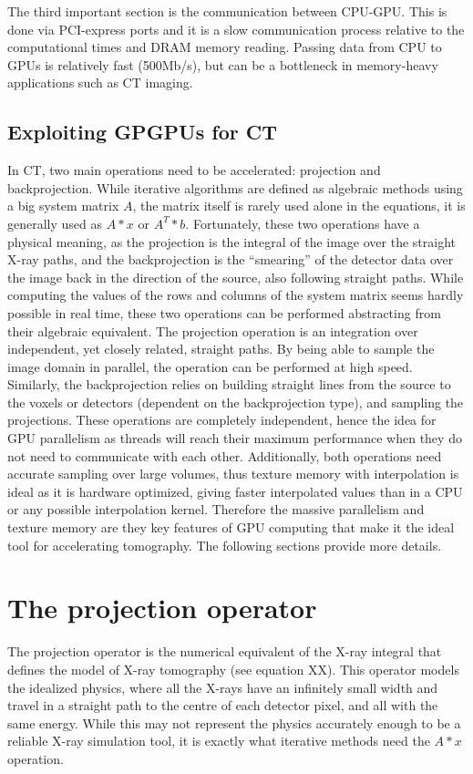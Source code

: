 The third important section is the communication between CPU-GPU. This is done via PCI-express ports and it is a slow communication process relative to the computational times and DRAM memory reading. Passing data from CPU to GPUs is relatively fast (500Mb/s), but can be a bottleneck in memory-heavy applications such as CT imaging.



\subsection{Exploiting GPGPUs for CT}

In CT, two main operations need to be accelerated: projection and backprojection. While iterative algorithms are defined as algebraic methods using a big system matrix $A$, the matrix itself is rarely used alone in the equations, it is generally used as $A*x$ or $A^T*b$. Fortunately, these two operations have a physical meaning, as the projection is the integral of the image over the straight X-ray paths, and the backprojection is the ``smearing'' of the detector data over the image back in the direction of the source, also following straight paths. While computing the values of the rows and columns of the system matrix seems hardly possible in real time, these two operations can be performed abstracting from their algebraic equivalent. The projection operation is an integration over independent, yet closely related, straight paths. By being able to sample the image domain in parallel, the operation can be performed at high speed. Similarly, the backprojection relies on building straight lines from the source to the voxels or detectors (dependent on the backprojection type), and sampling the projections. These operations are completely independent, hence the idea for GPU parallelism as threads will reach their maximum performance when they do not need to communicate with each other.  Additionally, both operations need accurate sampling over large volumes, thus texture memory with interpolation is ideal as it is hardware optimized, giving faster interpolated values than in a CPU or any possible interpolation kernel. Therefore the massive parallelism and texture memory are they key features of GPU computing that make it the ideal tool for accelerating tomography. The following sections provide more details.

\section{The projection operator}
The projection operator is the numerical equivalent of the X-ray integral that defines the model of X-ray tomography (see equation XX). This operator models the idealized physics, where all the X-rays have an infinitely small width and travel in a straight path to the centre of each detector pixel, and all with the same energy. While this may not represent the physics accurately enough to be a reliable X-ray  simulation tool, it is exactly what iterative methods need the $A*x$ operation. 


